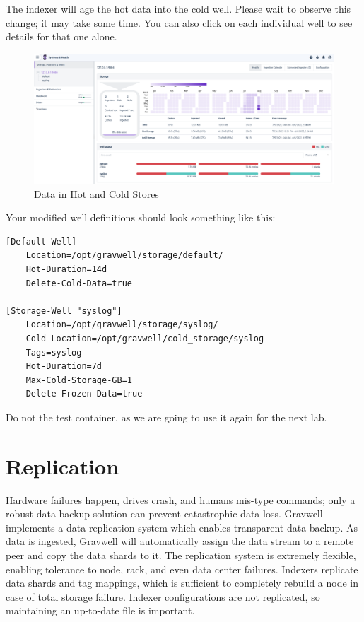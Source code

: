 {{The indexer will age the hot data into the cold well. Please wait to
observe this change; it may take some time. You can also
click on each individual well to see details for that one alone.

\begin{figure}
	\includegraphics{images/coldstore.png}
	\caption{Data in Hot and Cold Stores}
\end{figure}

\clearpage
Your modified  well definitions should look something
like this:
\begin{Verbatim}[breaklines=true]
[Default-Well]
    Location=/opt/gravwell/storage/default/
    Hot-Duration=14d
    Delete-Cold-Data=true

[Storage-Well "syslog"]
    Location=/opt/gravwell/storage/syslog/
    Cold-Location=/opt/gravwell/cold_storage/syslog
    Tags=syslog
    Hot-Duration=7d
    Max-Cold-Storage-GB=1
    Delete-Frozen-Data=true
\end{Verbatim}

Do not  the test container, as we are
going to use it again for the next lab.

\clearpage
\section{Replication}
Hardware failures happen, drives crash, and humans mis-type commands;
only a robust data backup solution can prevent catastrophic data loss.
Gravwell implements a data replication system which enables transparent
data backup. As data is ingested, Gravwell will automatically assign
the data stream to a remote peer and copy the data shards to it. The
replication system is extremely flexible, enabling tolerance to node,
rack, and even data center failures. Indexers replicate data shards and
tag mappings, which is sufficient to completely rebuild a node in case
of total storage failure. Indexer configurations are not replicated, so
maintaining an up-to-date  file is important.}

}
